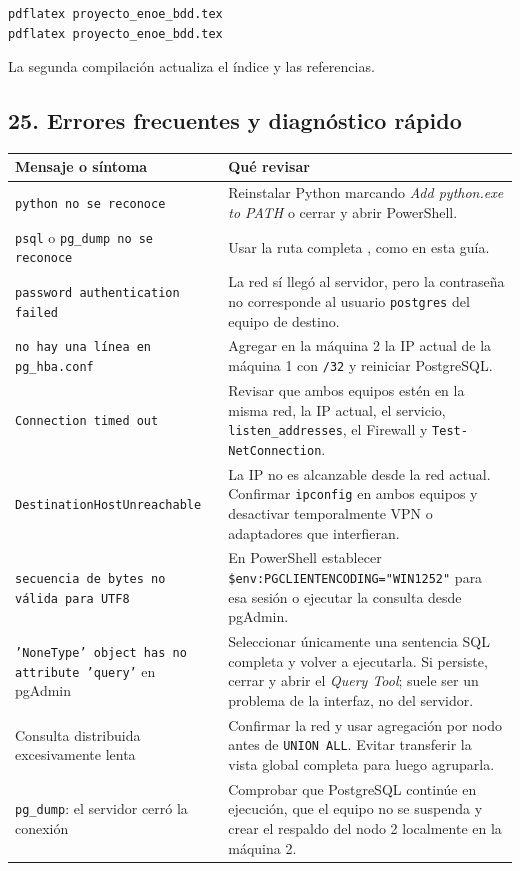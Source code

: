 \documentclass[12pt,letterpaper]{article}
\newcommand{\ruta}[1]{\texttt{\detokenize{#1}}}
\begin{document}
\begin{lstlisting}
pdflatex proyecto_enoe_bdd.tex
pdflatex proyecto_enoe_bdd.tex
\end{lstlisting}

La segunda compilación actualiza el índice y las referencias.

\subsection{25. Errores frecuentes y diagnóstico rápido}

\begin{longtable}{p{}p{}}
\toprule
\textbf{Mensaje o síntoma} & \textbf{Qué revisar} \\
\midrule
\texttt{python no se reconoce} &
Reinstalar Python marcando \textit{Add python.exe to PATH} o cerrar y abrir
PowerShell. \\
\texttt{psql} o \texttt{pg\_dump no se reconoce} &
Usar la ruta completa
\ruta{C:/Program Files/PostgreSQL/17/bin/psql.exe}, como en esta guía. \\
\texttt{password authentication failed} &
La red sí llegó al servidor, pero la contraseña no corresponde al usuario
\texttt{postgres} del equipo de destino. \\
\texttt{no hay una línea en pg\_hba.conf} &
Agregar en la máquina 2 la IP actual de la máquina 1 con \texttt{/32} y
reiniciar PostgreSQL. \\
\texttt{Connection timed out} &
Revisar que ambos equipos estén en la misma red, la IP actual, el servicio,
\texttt{listen\_addresses}, el Firewall y
\texttt{Test-NetConnection}. \\
\texttt{DestinationHostUnreachable} &
La IP no es alcanzable desde la red actual. Confirmar \texttt{ipconfig} en
ambos equipos y desactivar temporalmente VPN o adaptadores que interfieran. \\
\texttt{secuencia de bytes no válida para UTF8} &
En PowerShell establecer
\texttt{\$env:PGCLIENTENCODING="WIN1252"} para esa sesión o ejecutar la
consulta desde pgAdmin. \\
\texttt{'NoneType' object has no attribute 'query'} en pgAdmin &
Seleccionar únicamente una sentencia SQL completa y volver a ejecutarla. Si
persiste, cerrar y abrir el \textit{Query Tool}; suele ser un problema de la
interfaz, no del servidor. \\
Consulta distribuida excesivamente lenta &
Confirmar la red y usar agregación por nodo antes de \texttt{UNION ALL}.
Evitar transferir la vista global completa para luego agruparla. \\
\texttt{pg\_dump}: el servidor cerró la conexión &
Comprobar que PostgreSQL continúe en ejecución, que el equipo no se suspenda y
crear el respaldo del nodo 2 localmente en la máquina 2. \\
\bottomrule
\end{longtable}
\end{document}
